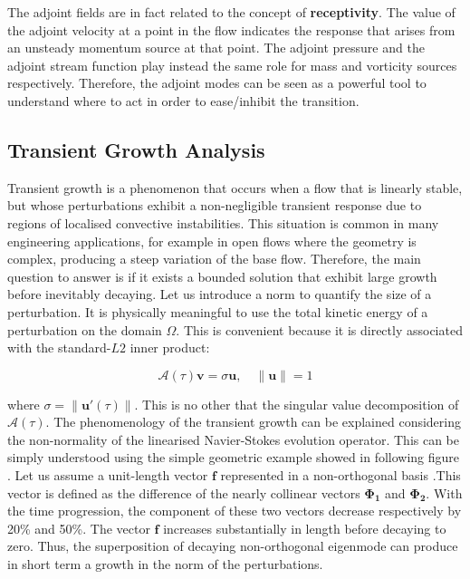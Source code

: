 The adjoint fields are in fact related to the concept of \textbf{receptivity}. The value of the adjoint velocity at a point in the flow indicates the response that arises from an unsteady momentum source at that point. The adjoint pressure and the adjoint stream function play instead the same role for mass and vorticity sources respectively. Therefore, the adjoint modes can be seen as a powerful tool to understand where to act in order to ease/inhibit the transition.

\subsection{Transient Growth Analysis}

Transient growth  is a phenomenon that occurs when a flow that is linearly stable, but whose perturbations exhibit a non-negligible transient response due to regions of localised convective instabilities. This situation is common in many engineering applications, for example in open flows where the geometry is complex, producing a steep variation of the base flow. Therefore, the main question to answer is if it exists a bounded solution that exhibit large growth before inevitably decaying. Let us introduce a norm to quantify the size of a perturbation. It is physically meaningful to use the total kinetic energy of a perturbation on the domain $\Omega$. This is convenient because it is directly associated with the
standard-$L2$ inner product: 

\begin{equation}
\mathcal{A}(\tau)\mathbf{v}=\sigma \mathbf{u}, \quad \left\| \mathbf{u} \right\|=1
\end{equation}


where $\sigma=\left\| \mathbf{u'}(\tau)\right\|$. This is no other that the singular value decomposition of $\mathcal{A}(\tau)$. The phenomenology of the transient growth can be explained considering the non-normality of the linearised Navier-Stokes evolution operator. This can be simply understood using the simple geometric example showed in following figure . Let us assume a unit-length vector $\mathbf{f}$ represented in a non-orthogonal basis .This vector is defined as the difference of the nearly collinear vectors $\mathbf{\Phi_1}$ and $\mathbf{\Phi_2}$.  With the time progression, the component of these two vectors decrease respectively by 20\% and 50\%. The vector $\mathbf{f}$ increases substantially in length before decaying to zero. Thus, the superposition of decaying non-orthogonal eigenmode can produce in short term a growth in the norm of the perturbations. 


